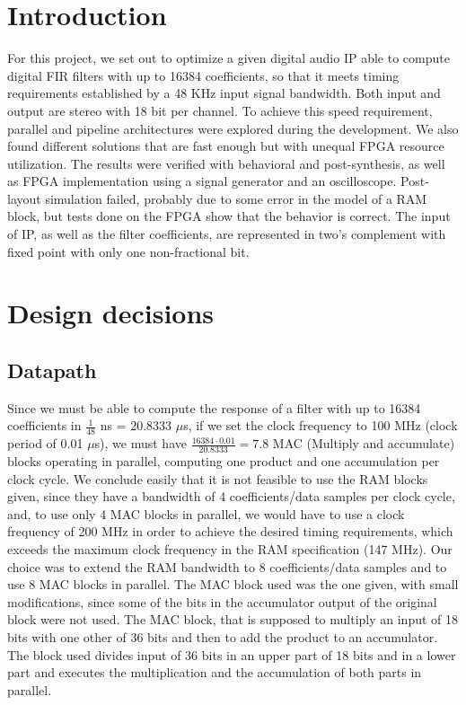 \documentclass[12pt]{article}
\begin{document}
{
	
	\pagestyle{empty}
	\titleAT
	\newpage
}
\setcounter{page}{1}

\section{Introduction}

For this project, we set out to optimize a given digital audio IP able to compute digital FIR
filters with up to 16384 coefficients, so that it meets timing requirements established by a 48 KHz
input signal bandwidth. Both input and output are stereo with 18 bit per channel. To achieve this
speed requirement, parallel and pipeline architectures were explored during the development. We also
found different solutions that are fast enough but with unequal FPGA resource utilization. The
results were verified with behavioral and post-synthesis, as well as FPGA implementation using a
signal generator and an oscilloscope. Post-layout simulation failed, probably due to some error in
the model of a RAM block, but tests done on the FPGA show that the behavior is correct.
The input of IP, as well as the filter coefficients, are represented in two's complement with fixed
point with only one non-fractional bit. 

\section{Design decisions}
\subsection{Datapath}
Since we must be able to compute the response of a filter with up to 16384 coefficients in
$\frac{1}{48}$ ns = 20.8333 $\mu$s, if we set the clock frequency to 100 MHz (clock period of 0.01
$\mu$s), we must have $\frac{16384\cdot0.01}{20.8333} = 7.8$ MAC (Multiply and accumulate) blocks
operating in parallel, computing one product and one accumulation per clock cycle. We conclude
easily that it is not feasible to use the RAM blocks given, since they have a bandwidth of 4
coefficients/data samples per clock cycle, and, to use only 4 MAC blocks in parallel, we would have
to use a clock frequency of 200 MHz in order to achieve the desired timing requirements, which
exceeds the maximum clock frequency in the RAM specification (147 MHz). Our choice was to extend the
RAM bandwidth to 8 coefficients/data samples and to use 8 MAC blocks in parallel. The MAC block used
was the one given, with small modifications, since some of the bits in the accumulator output of the
original block were not used. The MAC block, that is supposed to multiply an input of 18 bits with
one other of 36 bits and then to add the product to an accumulator. The block used divides input of
36 bits in an upper part of 18 bits and in a lower part and executes the multiplication and the
accumulation of both parts in parallel. 
\end{document}
